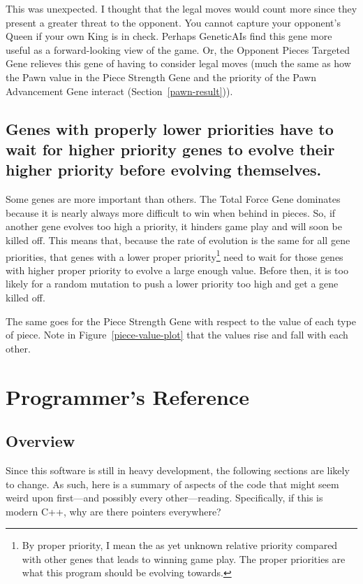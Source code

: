 \documentclass[letterpaper]{article}
\newcommand{\cpp}{C{\nobreak+}{\nobreak+}}
\renewcommand{\_}{\allowbreak\textunderscore\allowbreak}
\begin{document}
This was unexpected. I thought that the legal moves would count more since they present a greater threat to the opponent. You cannot capture your opponent's Queen if your own King is in check. Perhaps Genetic\_AIs find this gene more useful as a forward-looking view of the game. Or, the Opponent Pieces Targeted Gene relieves this gene of having to consider legal moves (much the same as how the Pawn value in the Piece Strength Gene and the priority of the Pawn Advancement Gene interact (Section~\ref{pawn-result})).

\subsection{Genes with properly lower priorities have to wait for higher priority genes to evolve their higher priority before evolving themselves.}\label{lower-priority-waits}

Some genes are more important than others. The Total Force Gene dominates because it is nearly always more difficult to win when behind in pieces. So, if another gene evolves too high a priority, it hinders game play and will soon be killed off. This means that, because the rate of evolution is the same for all gene priorities, that genes with a lower proper priority\footnote{By proper priority, I mean the as yet unknown relative priority compared with other genes that leads to winning game play. The proper priorities are what this program should be evolving towards.} need to wait for those genes with higher proper priority to evolve a large enough value. Before then, it is too likely for a random mutation to push a lower priority too high and get a gene killed off.

The same goes for the Piece Strength Gene with respect to the value of each type of piece. Note in Figure~\ref{piece-value-plot} that the values rise and fall with each other.

\section{Programmer's Reference}

\subsection{Overview}

Since this software is still in heavy development, the following sections are likely to change. As such, here is a summary of aspects of the code that might seem weird upon first---and possibly every other---reading. Specifically, if this is modern \cpp{}, why are there pointers everywhere?
\end{document}
